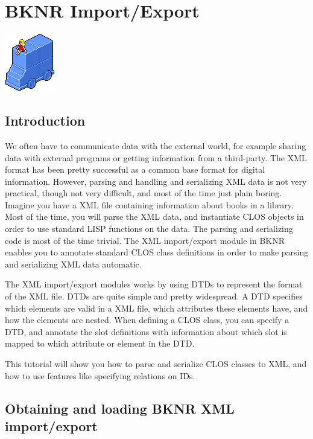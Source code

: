 \chapter{BKNR Import/Export}

\vbox{
    \centering
    \includegraphics{impexicon}
    \vspace{1cm}}

\section{ Introduction}

We often have to communicate data with the external world, for
example sharing data with external programs or getting information
from a third-party. The XML format has been pretty successful as a
common base format for digital information. However, parsing and
handling and serializing XML data is not very practical, though
not very difficult, and most of the time just plain
boring. Imagine you have a XML file containing information about
books in a library. Most of the time, you will parse the XML data,
and instantiate CLOS objects in order to use standard LISP
functions on the data. The parsing and serializing code is most of
the time trivial. The XML import/export module in BKNR enables you
to annotate standard CLOS class definitions in order to make
parsing and serializing XML data automatic.

The XML import/export modules works by using DTDs to represent the
format of the XML file. DTDs are quite simple and pretty
widespread. A DTD specifies which elements are valid in a XML
file, which attributes these elements have, and how the elements
are nested. When defining a CLOS class, you can specify a DTD, and
annotate the slot definitions with information about which slot is
mapped to which attribute or element in the DTD.

This tutorial will show you how to parse and serialize CLOS
classes to XML, and how to use features like specifying relations
on IDs.


\section{ Obtaining and loading BKNR XML import/export}

